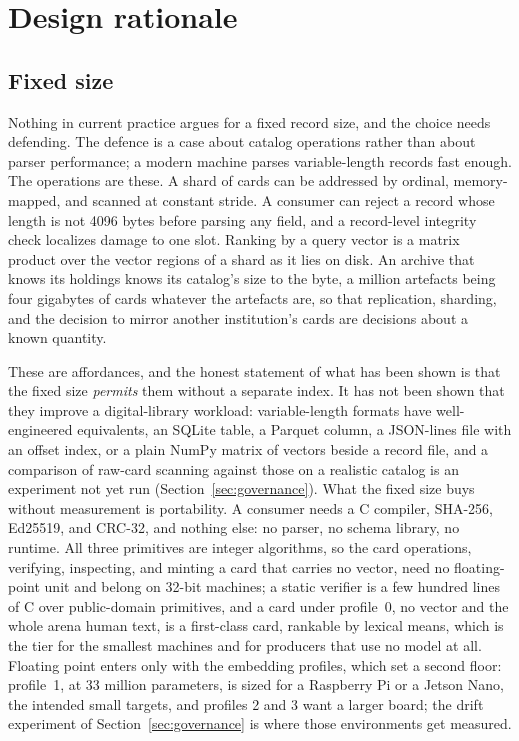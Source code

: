 \documentclass[11pt]{article}
\begin{document}
\section{Design rationale}
\label{sec:rationale}

\subsection{Fixed size}
\label{sec:fixed}

Nothing in current practice argues for a fixed record size, and the choice
needs defending. The defence is a case about catalog operations rather than
about parser performance; a modern machine parses variable-length records
fast enough. The operations are these. A shard of cards can be addressed by
ordinal, memory-mapped, and scanned at constant stride. A consumer can reject
a record whose length is not 4096 bytes before parsing any field, and a
record-level integrity check localizes damage to one slot. Ranking by a query
vector is a matrix product over the vector regions of a shard as it lies on
disk. An archive that knows its holdings knows its catalog's size to the
byte, a million artefacts being four gigabytes of cards whatever the artefacts
are, so that replication, sharding, and the decision to mirror another
institution's cards are decisions about a known quantity.

These are affordances, and the honest statement of what has been shown is
that the fixed size \emph{permits} them without a separate index. It has not
been shown that they improve a digital-library workload: variable-length
formats have well-engineered equivalents, an SQLite table, a Parquet column,
a JSON-lines file with an offset index, or a plain NumPy matrix of vectors
beside a record file, and a comparison of raw-card scanning against those on
a realistic catalog is an experiment not yet run (Section~\ref{sec:governance}).
What the fixed size buys without measurement is portability. A consumer
needs a C compiler, SHA-256, Ed25519, and CRC-32, and nothing else: no
parser, no schema library, no runtime. All three primitives are integer
algorithms, so the card operations, verifying, inspecting, and minting a
card that carries no vector, need no floating-point unit and belong on
32-bit machines; a static verifier is a few hundred lines of C over
public-domain primitives, and a card under profile~0, no vector and the
whole arena human text, is a first-class card, rankable by lexical means,
which is the tier for the smallest machines and for producers that use no
model at all. Floating point enters only with the embedding profiles, which
set a second floor: profile~1, at 33 million parameters, is sized for a
Raspberry Pi or a Jetson Nano, the intended small targets, and profiles 2
and 3 want a larger board; the drift experiment of
Section~\ref{sec:governance} is where those environments get measured.
\end{document}
